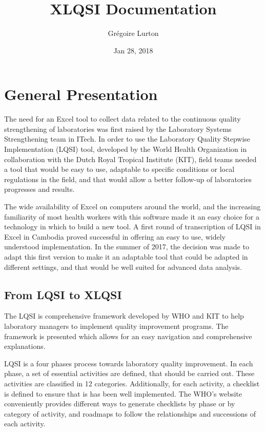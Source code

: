 \documentclass[letterpaper,10pt,english]{sphinxmanual}
\title{XLQSI Documentation}
\date{Jan 28, 2018}
\author{Grégoire Lurton}
\begin{document}
\maketitle
\sphinxtableofcontents
{}\label{\detokenize{index::doc}}



\chapter{General Presentation}
\label{\detokenize{intro:general-presentation}}\label{\detokenize{intro:documentation-for-xlqsi-s}}\label{\detokenize{intro::doc}}
The need for an Excel tool to collect data related to the continuous quality strengthening of laboratories was first raised by the Laboratory Systems
Strengthening team in ITech. In order to use the Laboratory Quality Stepwise Implementation (LQSI) tool, developed by the World Health Organization in collaboration with the Dutch Royal Tropical Institute (KIT), field teams needed a tool that would be easy to use, adaptable to specific conditions or local regulations in the field, and that would allow a better follow-up of laboratories progresses and results.

The wide availability of Excel on computers around the world, and the increasing familiarity of most health workers with this software made it an easy choice for a technology in which to build a new tool. A first round of transcription of LQSI in Excel in Cambodia proved successful in offering an easy to use, widely understood implementation. In the summer of 2017, the decision was made to adapt this first version to make it an adaptable tool that could be adapted in different settings, and that would be well suited for advanced data analysis.


\section{From LQSI to XLQSI}
\label{\detokenize{intro:from-lqsi-to-xlqsi}}
The LQSI is comprehensive framework developed by WHO and KIT to help laboratory managers to implement quality improvement programs. The framework is presented  which allows for an easy navigation and comprehensive explanations.

LQSI is a four phases process towards laboratory quality improvement. In each phase, a set of essential activities are defined, that should be carried out. These activities are classified in 12 categories. Additionally, for each activity, a checklist is defined to ensure that is has been well implemented. The WHO’s website conveniently provides different ways to generate checklists by phase or by category of activity, and roadmaps to follow the relationships and successions of each activity.
\end{document}
